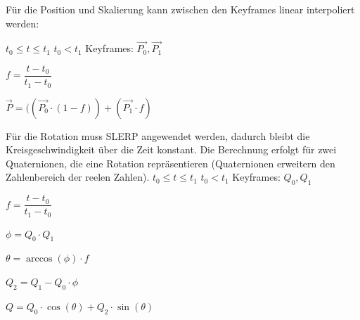Für die Position und Skalierung kann zwischen den Keyframes linear interpoliert werden:

$t_{0} \leq t \leq t_{1}$ \qquad $t_{0} < t_{1}$ \qquad Keyframes: $\overrightarrow{P_{0}}, \overrightarrow{P_{1}}$

$f = \dfrac{t - t_{0}}{t_{1} - t_{0}}$

$\overrightarrow{P} = ((\overrightarrow{P_{0}} \cdot (1 - f)) + (\overrightarrow{P_{1}} \cdot f)$

Für die Rotation muss \ac{SLERP} \cite{WikiSlerp} angewendet werden, dadurch bleibt die Kreisgeschwindigkeit über die Zeit konstant. Die Berechnung erfolgt für zwei Quaternionen, die eine Rotation repräsentieren (Quaternionen erweitern den Zahlenbereich der reelen Zahlen).
$t_{0} \leq t \leq t_{1}$ \qquad $t_{0} < t_{1}$ \qquad Keyframes: $Q_{0}, Q_{1}$

$f = \dfrac{t - t_{0}}{t_{1} - t_{0}}$

$\phi = Q_{0} \cdot Q_{1}$

$\theta = \arccos(\phi) \cdot f$

$Q_{2} = Q_{1} - Q_{0} \cdot \phi$

$Q = Q_{0} \cdot \cos(\theta) + Q_{2} \cdot \sin(\theta)$

